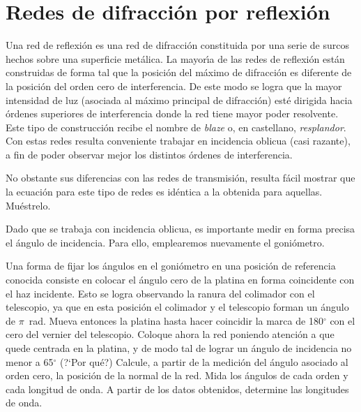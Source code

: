 \documentclass[laboratorio]{guia}
\begin{document}
\section{Redes de difracci\'on por reflexi\'on}

Una red de reflexi\'on es una red de difracci\'on constituida por una serie
de surcos hechos sobre una superficie met\'alica. La mayor\'\i a de las redes
de reflexi\'on est\'an construidas de forma tal que la posici\'on del m\'aximo
de difracci\'on es diferente de la posici\'on del orden cero de interferencia.
De este modo se logra que la mayor intensidad de luz (asociada al 
m\'aximo principal de difracci\'on) est\'e dirigida hacia \'ordenes superiores
de interferencia donde la red tiene mayor poder resolvente. Este tipo de 
construcci\'on recibe el nombre de {\it blaze} o, en castellano, {\it
resplandor}. Con estas redes resulta conveniente trabajar en incidencia oblicua
(casi razante), a fin de poder observar mejor los distintos \'ordenes de
interferencia. 

No obstante sus diferencias con las redes de transmisi\'on, resulta f\'acil
mostrar que la ecuaci\'on para este tipo de redes es id\'entica a la obtenida
para aquellas. Mu\'estrelo. 

Dado que se trabaja con incidencia oblicua, es importante medir en forma 
precisa el \'angulo de incidencia. Para ello, emplearemos nuevamente el 
goni\'ometro. 

Una forma de fijar los \'angulos en el goni\'ometro en una posici\'on de 
referencia conocida consiste en colocar el \'angulo cero de la platina en 
forma coincidente con el haz incidente. Esto se logra observando la ranura
del colimador con el telescopio, ya que en esta posici\'on el colimador
y el telescopio forman un \'angulo de $\pi$~rad. Mueva entonces la platina
hasta hacer coincidir la marca de 180$^\circ$ con el cero del vernier del
telescopio. Coloque ahora la red poniendo atenci\'on a que quede centrada en
la platina, y de modo tal de lograr un \'angulo de incidencia no menor a 
65$^\circ$ (?`Por qu\'e?) Calcule, a partir de la medici\'on del \'angulo 
asociado al orden cero, la posici\'on de la normal de la red. Mida los 
\'angulos de cada orden y cada longitud de onda. A partir de los datos 
obtenidos, determine las longitudes de onda. 



\end{document}
